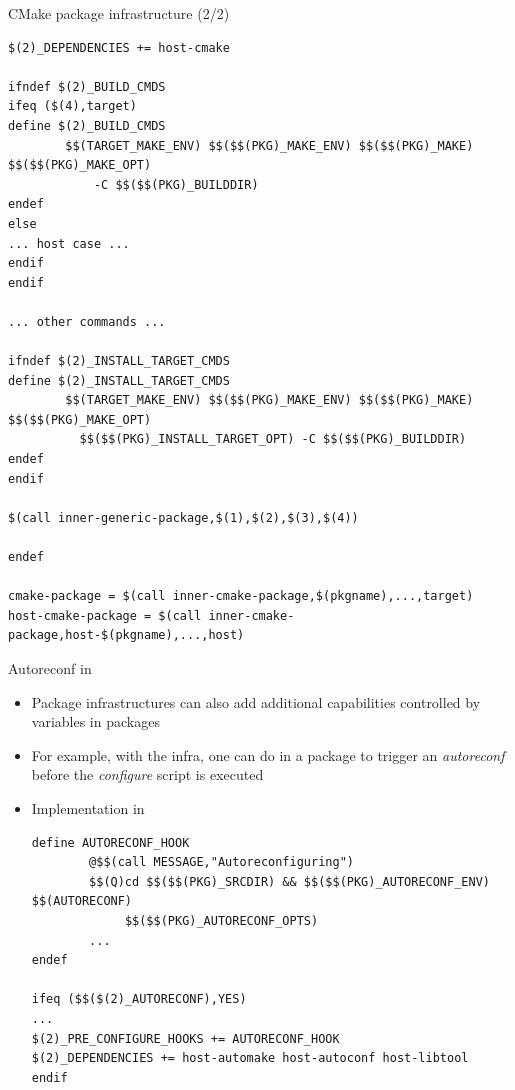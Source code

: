 \begin{frame}[fragile]{CMake package infrastructure (2/2)}

\begin{block}{}
\begin{verbatim}
$(2)_DEPENDENCIES += host-cmake

ifndef $(2)_BUILD_CMDS
ifeq ($(4),target)
define $(2)_BUILD_CMDS
        $$(TARGET_MAKE_ENV) $$($$(PKG)_MAKE_ENV) $$($$(PKG)_MAKE) $$($$(PKG)_MAKE_OPT)
            -C $$($$(PKG)_BUILDDIR)
endef
else
... host case ...
endif
endif

... other commands ...

ifndef $(2)_INSTALL_TARGET_CMDS
define $(2)_INSTALL_TARGET_CMDS
        $$(TARGET_MAKE_ENV) $$($$(PKG)_MAKE_ENV) $$($$(PKG)_MAKE) $$($$(PKG)_MAKE_OPT)
          $$($$(PKG)_INSTALL_TARGET_OPT) -C $$($$(PKG)_BUILDDIR)
endef
endif

$(call inner-generic-package,$(1),$(2),$(3),$(4))

endef

cmake-package = $(call inner-cmake-package,$(pkgname),...,target)
host-cmake-package = $(call inner-cmake-package,host-$(pkgname),...,host)
\end{verbatim}
\end{block}

\end{frame}

\begin{frame}[fragile]{Autoreconf in }
  \begin{itemize}
  \item Package infrastructures can also add additional capabilities
    controlled by variables in packages
  \item For example, with the  infra, one can
    do  in a package to trigger an {\em
      autoreconf} before the {\em configure} script is executed
  \item Implementation in 
    \begin{block}{}
      \begin{verbatim}
define AUTORECONF_HOOK
        @$$(call MESSAGE,"Autoreconfiguring")
        $$(Q)cd $$($$(PKG)_SRCDIR) && $$($$(PKG)_AUTORECONF_ENV) $$(AUTORECONF)
             $$($$(PKG)_AUTORECONF_OPTS)
        ...
endef

ifeq ($$($(2)_AUTORECONF),YES)
...
$(2)_PRE_CONFIGURE_HOOKS += AUTORECONF_HOOK
$(2)_DEPENDENCIES += host-automake host-autoconf host-libtool
endif
      \end{verbatim}
    \end{block}
  \end{itemize}
\end{frame}

